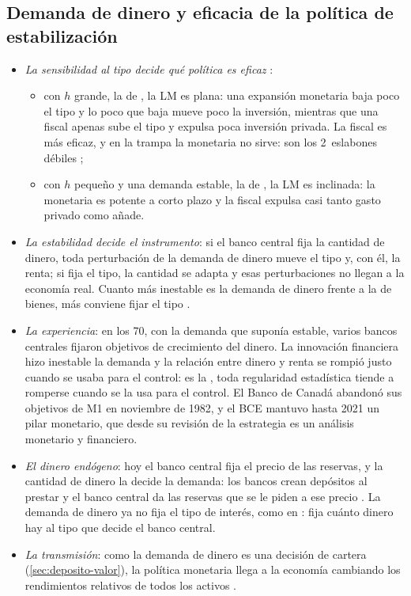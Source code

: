 \documentclass[11pt]{article}
\begin{document}
\subsection{Demanda de dinero y eficacia de la política de estabilización}\label{sec:estabilizacion}

\begin{itemize}
\item \emph{La sensibilidad al tipo decide qué política es eficaz} :
  \begin{itemize}
  \item con $h$ grande, la de , la LM es plana: una expansión monetaria baja poco el tipo y lo poco que baja mueve poco la inversión, mientras que una fiscal apenas sube el tipo y expulsa poca inversión privada. La fiscal es más eficaz, y en la trampa la monetaria no sirve: son los 2~eslabones débiles ;
  \item con $h$ pequeño y una demanda estable, la de , la LM es inclinada: la monetaria es potente a corto plazo y la fiscal expulsa casi tanto gasto privado como añade.
  \end{itemize}
\item \emph{La estabilidad decide el instrumento}: si el banco central fija la cantidad de dinero, toda perturbación de la demanda de dinero mueve el tipo y, con él, la renta; si fija el tipo, la cantidad se adapta y esas perturbaciones no llegan a la economía real. Cuanto más inestable es la demanda de dinero frente a la de bienes, más conviene fijar el tipo\nocite{Poole1970Optimal} .
\item \emph{La experiencia}: en los 70, con la demanda que  suponía estable, varios bancos centrales fijaron objetivos de crecimiento del dinero. La innovación financiera hizo inestable la demanda y la relación entre dinero y renta se rompió justo cuando se usaba para el control: es la , toda regularidad estadística tiende a romperse cuando se la usa para el control\nocite{Goodhart1975Problems}. El Banco de Canadá abandonó sus objetivos de M1 en noviembre de 1982\nocite{Bouey1982Statement}, y el BCE mantuvo hasta 2021 un pilar monetario, que desde su revisión de la estrategia es un análisis monetario y financiero\nocite{BCE2021Estrategia}.
\item \emph{El dinero endógeno}: hoy el banco central fija el precio de las reservas, y la cantidad de dinero la decide la demanda: los bancos crean depósitos al prestar y el banco central da las reservas que se le piden a ese precio\nocite{McLeayRadiaThomas2014Money} . La demanda de dinero ya no fija el tipo de interés, como en : fija cuánto dinero hay al tipo que decide el banco central.
\item \emph{La transmisión}: como la demanda de dinero es una decisión de cartera (\ref{sec:deposito-valor}), la política monetaria llega a la economía cambiando los rendimientos relativos de todos los activos .
\end{itemize}
\end{document}
